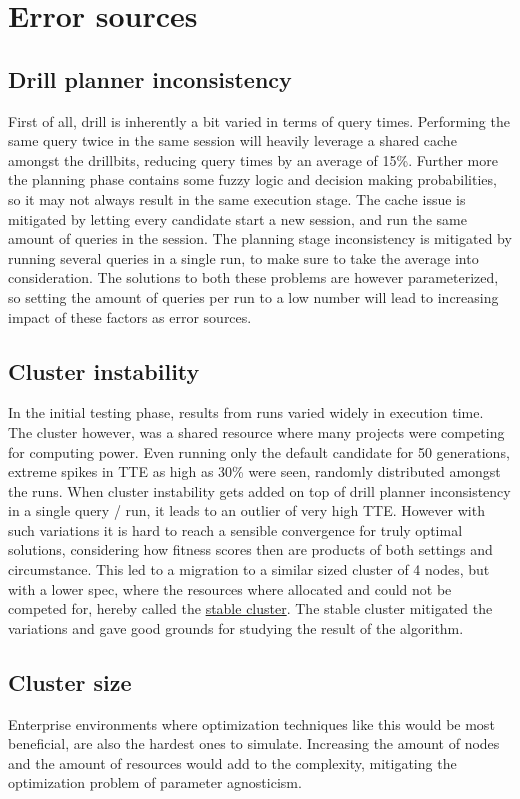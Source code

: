 \documentclass[a4paper,english]{report}
\begin{document}
	\section{Error sources}
		\subsection{Drill planner inconsistency}
		First of all, drill is inherently a bit varied in terms of query times. Performing the same query twice in the same session will heavily leverage a shared cache amongst the drillbits, reducing query times by an average of 15\%. Further more the planning phase contains some fuzzy logic and decision making probabilities, so it may not always result in the same execution stage. The cache issue is mitigated by letting every candidate start a new session, and run the same amount of queries in the session. The planning stage inconsistency is mitigated by running several queries in a single run, to make sure to take the average into consideration. The solutions to both these problems are however parameterized, so setting the amount of queries per run to a low number will lead to increasing impact of these factors as error sources.
		\subsection{Cluster instability}
		In the initial testing phase, results from runs varied widely in execution time. The cluster however, was a shared resource where many projects were competing for computing power. Even running only the default candidate for 50 generations, extreme spikes in TTE as high as 30\% were seen, randomly distributed amongst the runs. When cluster instability gets added on top of drill planner inconsistency in a single query / run, it leads to an outlier of very high TTE. However with such variations it is hard to reach a sensible convergence for truly optimal solutions, considering how fitness scores then are products of both settings and circumstance. This led to a migration to a similar sized cluster of 4 nodes, but with a lower spec, where the resources where allocated and could not be competed for, hereby called the \hyperref[table:cluster_stable]{stable cluster}. The stable cluster mitigated the variations and gave good grounds for studying the result of the algorithm. 
		\subsection{Cluster size}
		Enterprise environments where optimization techniques like this would be most beneficial, are also the hardest ones to simulate. Increasing the amount of nodes and the amount of resources would add to the complexity, mitigating the optimization problem of parameter agnosticism. 
\end{document}
